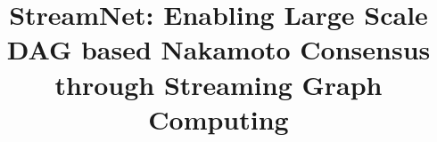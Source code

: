 \documentclass[sigconf, review]{acmart}
\begin{document}
\title{StreamNet: Enabling Large Scale DAG based Nakamoto Consensus through Streaming Graph Computing}


\maketitle

%










\end{document}
